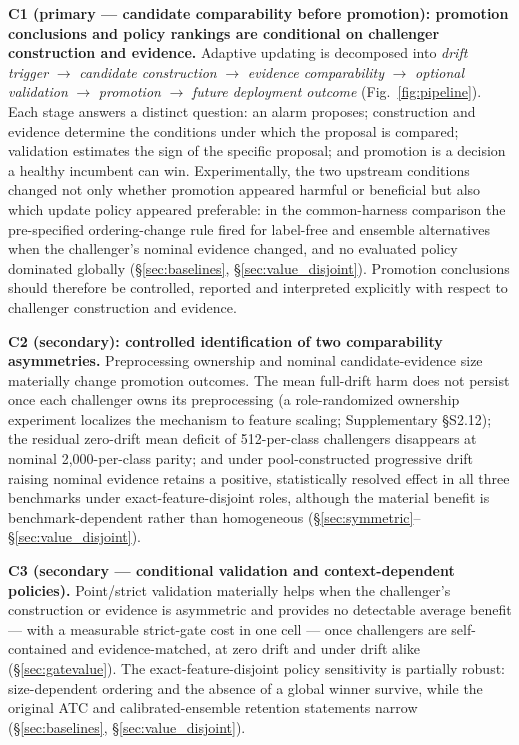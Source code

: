 \documentclass[journal]{IEEEtran}
\begin{document}
\textbf{C1 (primary --- candidate comparability before promotion): promotion conclusions and policy rankings are conditional on challenger construction and evidence.} Adaptive updating is decomposed into \emph{drift trigger} $\to$ \emph{candidate construction} $\to$ \emph{evidence comparability} $\to$ \emph{optional validation} $\to$ \emph{promotion} $\to$ \emph{future deployment outcome} (Fig.~\ref{fig:pipeline}). Each stage answers a distinct question: an alarm proposes; construction and evidence determine the conditions under which the proposal is compared; validation estimates the sign of the specific proposal; and promotion is a decision a healthy incumbent can win. Experimentally, the two upstream conditions changed not only whether promotion appeared harmful or beneficial but also which update policy appeared preferable: in the common-harness comparison the pre-specified ordering-change rule fired for label-free and ensemble alternatives when the challenger's nominal evidence changed, and no evaluated policy dominated globally (\S\ref{sec:baselines}, \S\ref{sec:value_disjoint}). Promotion conclusions should therefore be controlled, reported and interpreted explicitly with respect to challenger construction and evidence.

\textbf{C2 (secondary): controlled identification of two comparability asymmetries.} Preprocessing ownership and nominal candidate-evidence size materially change promotion outcomes. The mean full-drift harm does not persist once each challenger owns its preprocessing (a role-randomized ownership experiment localizes the mechanism to feature scaling; Supplementary \S S2.12); the residual zero-drift mean deficit of 512-per-class challengers disappears at nominal 2{,}000-per-class parity; and under pool-constructed progressive drift raising nominal evidence retains a positive, statistically resolved effect in all three benchmarks under exact-feature-disjoint roles, although the material benefit is benchmark-dependent rather than homogeneous (\S\ref{sec:symmetric}--\S\ref{sec:value_disjoint}).

\textbf{C3 (secondary --- conditional validation and context-dependent policies).} Point/strict validation materially helps when the challenger's construction or evidence is asymmetric and provides no detectable average benefit --- with a measurable strict-gate cost in one cell --- once challengers are self-contained and evidence-matched, at zero drift and under drift alike (\S\ref{sec:gatevalue}). The exact-feature-disjoint policy sensitivity is partially robust: size-dependent ordering and the absence of a global winner survive, while the original ATC and calibrated-ensemble retention statements narrow (\S\ref{sec:baselines}, \S\ref{sec:value_disjoint}).
\end{document}
